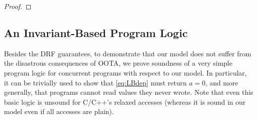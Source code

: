 \begin{proof}




\end{proof}






\subsection{An Invariant-Based Program Logic}
\label{sec:invariant}
Besides the DRF guarantees, to demonstrate that our model does not suffer from
the disastrous consequences of OOTA, 
we prove soundness of a very simple program logic for concurrent programs with respect to our model.
In particular, it can be trivially used to show that \ref{eq:LBdep} must return $a=0$,
and more generally, that programs cannot read values they never wrote.
Note that even this basic logic is unsound for C/C++'s relaxed accesses
(whereas it is sound in our model even if all accesses are plain).

